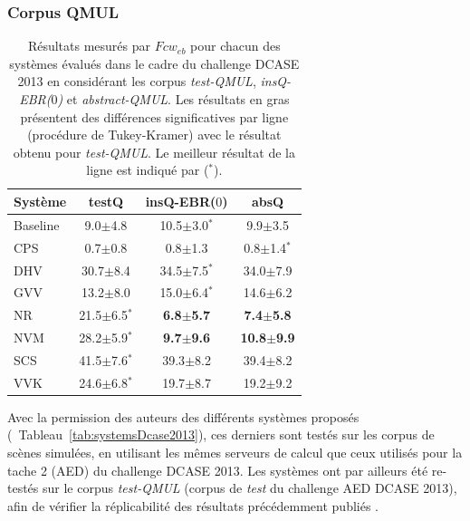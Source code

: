 \subsubsection{Corpus QMUL}

\begin{table}[t] 
\begin{center}  
\begin{tabular}{lccc}  
Système  & testQ & insQ-EBR($0$) & absQ \\ 
\hline 
Baseline & 9.0$\pm$4.8      & 10.5$\pm$3.0$^*$     & 9.9$\pm$3.5 \\ 
CPS      & 0.7$\pm$0.8      & 0.8$\pm$1.3          & 0.8$\pm$1.4$^*$ \\ 
DHV      & 30.7$\pm$8.4     & 34.5$\pm$7.5$^*$     & 34.0$\pm$7.9 \\ 
GVV      & 13.2$\pm$8.0     & 15.0$\pm$6.4$^*$     & 14.6$\pm$6.2 \\ 
NR       & 21.5$\pm$6.5$^*$ & \textbf{6.8$\pm$5.7} & \textbf{7.4$\pm$5.8} \\ 
NVM      & 28.2$\pm$5.9$^*$ & \textbf{9.7$\pm$9.6} & \textbf{10.8$\pm$9.9} \\ 
SCS      & 41.5$\pm$7.6$^*$ & 39.3$\pm$8.2         & 39.4$\pm$8.2 \\ 
VVK      & 24.6$\pm$6.8$^*$ & 19.7$\pm$8.7         & 19.2$\pm$9.2 \\  
\hline
\end{tabular} 
\end{center} 
\caption[Résultats mesurés par $Fcw_{eb}$ pour chacun des systèmes évalués dans le cadre du challenge DCASE 2013 en considérant les corpus \emph{test-QMUL}, \emph{insQ-EBR($0$)} et \emph{abstract-QMUL}.]{Résultats mesurés par $Fcw_{eb}$ pour chacun des systèmes évalués dans le cadre du challenge DCASE 2013 en considérant les corpus \emph{test-QMUL}, \emph{insQ-EBR($0$)} et \emph{abstract-QMUL}. Les résultats en gras présentent des différences significatives par ligne (procédure de Tukey-Kramer) avec le résultat obtenu pour \emph{test-QMUL}. Le meilleur résultat de la ligne est indiqué par ($^*$).} 
\label{tab:qmul} 
\end{table} 

Avec la permission des auteurs des différents systèmes proposés (\cf~Tableau~\ref{tab:systemsDcase2013}), ces derniers sont testés sur les corpus de scènes simulées, en utilisant les mêmes serveurs de calcul que ceux utilisés pour la tache 2 (AED) du challenge DCASE 2013. Les systèmes ont par ailleurs été re-testés sur le corpus \emph{test-QMUL} (corpus de \emph{test} du challenge AED DCASE 2013), afin de vérifier la réplicabilité des résultats précédemment publiés \citep{Stowell15}.

